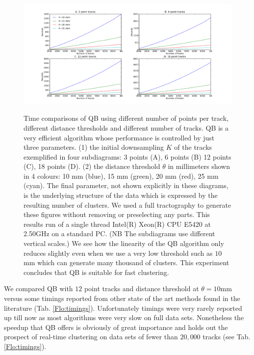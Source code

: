 \documentclass[preprint,authoryear,a4paper,10pt,onecolumn]{elsarticle}
\begin{document}
\begin{figure}
\noindent \begin{centering}
\label{Flo:Speed1}\includegraphics[scale=0.33]{2x2+leg-box}
\par\end{centering}

\caption{Time comparisons of QB using different number of points per
  track, different distance thresholds and different number of
  tracks. QB is a very efficient algorithm whose performance is
  controlled by just three parameters. (1) the initial downsampling $K$
  of the tracks exemplified in four subdiagrams: 3 points (A), 6 points
  (B) 12 points (C), 18 points (D). (2) the distance threshold $\theta$
  in millimeters shown in 4 colours: 10 mm (blue), 15 mm (green), 20 mm
  (red), 25 mm (cyan). The final parameter, not shown explicitly in
  these diagrams, is the underlying structure of the data which is
  expressed by the resulting number of clusters.  We used a full
  tractography to generate these figures without removing or
  preselecting any parts. This results run of a single thread Intel(R)
  Xeon(R) CPU E5420 at 2.50GHz on a standard PC. (NB The subdiagrams use
  different vertical scales.) We see how the linearity of the QB
  algorithm only reduces slightly even when we use a very low threshold
  such as $10$ mm which can generate many thousand of clusters. This
  experiment concludes that QB is suitable for fast clustering.}

\end{figure}

We compared QB with $12$ point tracks and distance threshold at
$\theta=10$mm versus some timings reported from other state of the art
methods found in the literature (Tab. \ref{Flo:timings}). Unfortunately
timings were very rarely reported up till now as most algorithms were
very slow on full data sets. Nonetheless the speedup that QB offers is
obviously of great importance and holds out the prospect of real-time
clustering on data sets of fewer than $20,000$ tracks (see
Tab. \ref{Flo:timings}).
\end{document}
